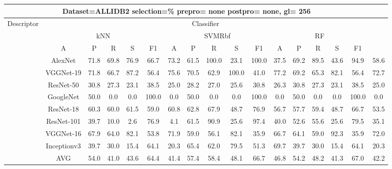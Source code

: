 \documentclass[12pt,italian]{article}
\begin{document}
\begin{tiny}
\begin{longtable}{lcccccccccccccccc}
\toprule
\multicolumn{16}{c}{Dataset=ALLIDB2 selection=\% prepro= none postpro= none, gl= 256} \\ 
\toprule
Descriptor & \multicolumn{15}{c}{Classifier} \\ 
& \multicolumn{5}{c}{kNN} & \multicolumn{5}{c}{SVMRbf} & \multicolumn{5}{c}{RF} \\ 
& A & P & R & S & F1 & A & P & R & S & F1 & A & P & R & S & F1 \\ 
\midrule
& AlexNet & 71.8 & 69.8 & 76.9 & 66.7 & 73.2 & 61.5 & 100.0 & 23.1 & 100.0 & 37.5 & 69.2 & 89.5 & 43.6 & 94.9 & 58.6 \\ 
& VGGNet-19 & 71.8 & 66.7 & 87.2 & 56.4 & 75.6 & 70.5 & 62.9 & 100.0 & 41.0 & 77.2 & 69.2 & 65.3 & 82.1 & 56.4 & 72.7 \\ 
& ResNet-50 & 30.8 & 27.3 & 23.1 & 38.5 & 25.0 & 28.2 & 27.0 & 25.6 & 30.8 & 26.3 & 30.8 & 27.3 & 23.1 & 38.5 & 25.0 \\ 
& GoogleNet & 50.0 &  0.0 &  0.0 & 100.0 &  0.0 & 50.0 &  0.0 &  0.0 & 100.0 &  0.0 & 50.0 &  0.0 &  0.0 & 100.0 &  0.0 \\ 
& ResNet-18 & 60.3 & 60.0 & 61.5 & 59.0 & 60.8 & 62.8 & 67.9 & 48.7 & 76.9 & 56.7 & 57.7 & 59.4 & 48.7 & 66.7 & 53.5 \\ 
& ResNet-101 & 39.7 & 10.0 &  2.6 & 76.9 &  4.1 & 61.5 & 90.9 & 25.6 & 97.4 & 40.0 & 52.6 & 55.6 & 25.6 & 79.5 & 35.1 \\ 
& VGGNet-16 & 67.9 & 64.0 & 82.1 & 53.8 & 71.9 & 59.0 & 56.1 & 82.1 & 35.9 & 66.7 & 64.1 & 59.0 & 92.3 & 35.9 & 72.0 \\ 
& Inceptionv3 & 39.7 & 30.0 & 15.4 & 64.1 & 20.3 & 65.4 & 62.0 & 79.5 & 51.3 & 69.7 & 39.7 & 30.0 & 15.4 & 64.1 & 20.3 \\ 
\hline
& AVG & 54.0 & 41.0 & 43.6 & 64.4 & 41.4 & 57.4 & 58.4 & 48.1 & 66.7 & 46.8 & 54.2 & 48.2 & 41.3 & 67.0 & 42.2 \\ 
\hline
\bottomrule
\end{longtable} 

 \pagebreak 
\end{tiny} 
 
\end{document}
